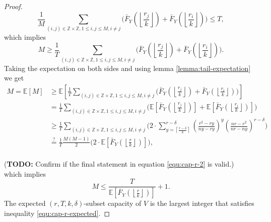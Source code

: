\documentclass[10pt]{extarticle}
\newcommand{\Z}{\mathbb{Z}}
\theoremstyle{definition}
\begin{document}
\begin{proof}
\begin{equation*}
      \frac{1}{M} \sum_{(i,j) \in \Z\times\Z, 1 \le i,j \le M, i \ne j}  \Biggl( \bar{F}_Y\left(\left\lfloor \frac{r_j}{k} \right\rfloor\right) + \bar{F}_Y\left(\left\lfloor \frac{r_i}{k} \right\rfloor\right) \Biggr)  \le T,
\end{equation*}
\noindent which implies
\begin{equation}
\label{equ:cap-r}      
       M \geq \frac{1}{T}\sum_{(i,j) \in \Z\times\Z, 1 \le i,j \le M, i \ne j}  \Biggl( \bar{F}_Y\left(\left\lfloor \frac{r_j}{k} \right\rfloor\right) + \bar{F}_Y\left(\left\lfloor \frac{r_i}{k} \right\rfloor\right)\Biggr). 
\end{equation}
Taking the expectation on both sides and using lemma \ref{lemma:tail-expectation} we get
\begin{equation}
\label{equ:cap-r-2}
    \begin{split}
           M = \mathbb{E}[M] &\geq \mathbb{E} \left[\frac{1}{T}\sum_{(i,j) \in \Z\times\Z, 1 \le i,j \le M, i \ne j}  \Biggl( \bar{F}_Y\left(\left\lfloor \frac{r_j}{k} \right\rfloor\right) + \bar{F}_Y\left(\left\lfloor \frac{r_i}{k} \right\rfloor\right)\Biggr) \right] \\ &= 
           \frac{1}{T}\sum_{(i,j) \in \Z\times\Z, 1 \le i,j \le M, i \ne j}  \Biggl( \mathbb{E} \left[ \bar{F}_Y\left(\left\lfloor \frac{r_j}{k} \right\rfloor\right) \right] + \mathbb{E} \left[ \bar{F}_Y\left(\left\lfloor \frac{r_i}{k} \right\rfloor\right) \right]\Biggr) \\
           &\ge
           \frac{1}{T}\sum_{(i,j) \in \Z\times\Z, 1 \le i,j \le M, i \ne j}  \Biggl( 2 \cdot \sum_{y = \left\lceil \frac{r-\delta}{k} \right\rceil}^{r-\delta}
           \left(\frac{r^2 - ry}{ny-ry}\right)^{y} \left(\frac{nr-r^2}{nr-ny}\right)^{r-\delta}\Biggr) \\
           &\stackrel{?}{=}\frac{1}{T} \frac{M(M-1)}{2} \Biggl( 2 \cdot \mathbb{E} \left[ \bar{F}_Y\left(\left\lfloor \frac{r}{k} \right\rfloor\right) \right]\Biggr),
    \end{split}
    \end{equation} \\
(\textbf{TODO:} Confirm if the final statement in equation \ref{equ:cap-r-2} is valid.) \\

which implies 
\begin{equation}
    \label{equ:cap-r-expected}     
    M \le \frac{T}{\mathbb{E} \left[\bar{F}_Y\left(\left\lfloor \frac{r}{k} \right\rfloor\right)\right]} + 1.
\end{equation}
The expected $(r,T,k,\delta)$-subset capacity of $V$ is the largest integer that satisfies inequality \ref{equ:cap-r-expected}.
    
\end{proof}
\end{document}

